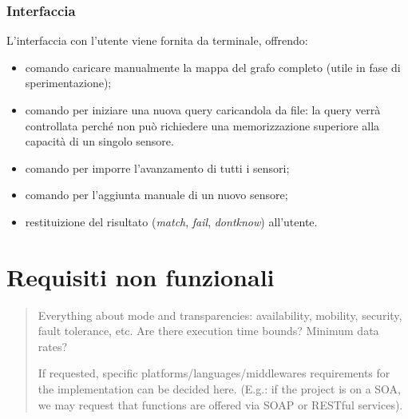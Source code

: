 \documentclass{llncs}
\begin{document}
\subsubsection*{Interfaccia}
L'interfaccia con l'utente viene fornita da terminale, offrendo:
\begin{itemize}
\item comando caricare manualmente la mappa del grafo
  completo (utile in fase di sperimentazione);
\item comando per iniziare una nuova query caricandola da file:
  la query verrà controllata perché non può richiedere una
  memorizzazione superiore alla capacità di un singolo sensore.
\item comando per imporre l'avanzamento di tutti i sensori;
\item comando per l'aggiunta manuale di un nuovo sensore;
\item restituizione del risultato (\emph{match}, \emph{fail},
  \emph{dontknow}) all'utente.
\end{itemize}

\section{Requisiti non funzionali}
\label{sec:nonfunc-req}
\begin{quote}
  Everything about mode and transparencies:
  availability, mobility, security, fault tolerance, etc.
  Are there execution time bounds? Minimum data rates?

  If requested, specific platforms/languages/middlewares requirements
  for the implementation can be decided here.
  (E.g.: if the project is on a SOA, we may request that functions
  are offered via SOAP or RESTful services).
\end{quote}

\end{document}
